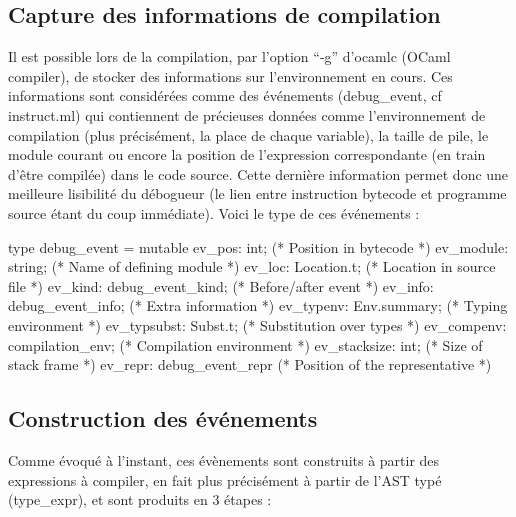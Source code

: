 \documentclass[11pt,a4paper]{report}
\begin{document}
\subsection{Capture des informations de compilation}

Il est possible lors de la compilation, par l'option ``-g'' d'ocamlc (OCaml compiler), de stocker des informations sur l'environnement en cours. Ces informations sont considérées comme des événements (debug\_event, cf instruct.ml) qui contiennent de précieuses données comme l'environnement de compilation (plus précisément, la place de chaque variable), la taille de pile, le module courant ou encore la position de l'expression correspondante (en train d'être compilée) dans le code source. Cette dernière information permet donc une meilleure lisibilité du débogueur (le lien entre instruction bytecode et programme source étant du coup immédiate). Voici le type de ces événements :

\begin{OCaml}

type debug_event =
  { mutable ev_pos: int;                (* Position in bytecode *)
    ev_module: string;                  (* Name of defining module *)
    ev_loc: Location.t;                 (* Location in source file *)
    ev_kind: debug_event_kind;          (* Before/after event *)
    ev_info: debug_event_info;          (* Extra information *)
    ev_typenv: Env.summary;             (* Typing environment *)
    ev_typsubst: Subst.t;               (* Substitution over types *)
    ev_compenv: compilation_env;        (* Compilation environment *)
    ev_stacksize: int;                  (* Size of stack frame *)
    ev_repr: debug_event_repr }         (* Position of the representative *)

\end{OCaml}

\medskip

\subsection{Construction des événements}

Comme évoqué à l'instant, ces évènements sont construits à partir des expressions à compiler, en fait plus précisément à partir de l'AST typé (type\_expr), et sont produits en 3 étapes :

\medskip
\end{document}
